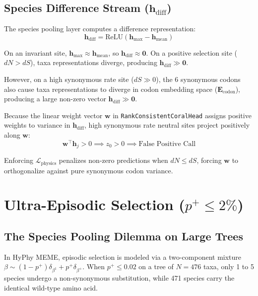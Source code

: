 \documentclass[11pt,a4paper]{article}
\begin{document}
\subsection{Species Difference Stream ($\mathbf{h}_{\text{diff}}$)}
The species pooling layer computes a difference representation:
\begin{equation}
\mathbf{h}_{\text{diff}} = \text{ReLU}\left(\mathbf{h}_{\text{max}} - \mathbf{h}_{\text{mean}}\right)
\end{equation}

On an invariant site, $\mathbf{h}_{\text{max}} \approx \mathbf{h}_{\text{mean}}$, so $\mathbf{h}_{\text{diff}} \approx \mathbf{0}$. On a positive selection site ($dN > dS$), taxa representations diverge, producing $\mathbf{h}_{\text{diff}} \gg \mathbf{0}$.

However, on a high synonymous rate site ($dS \gg 0$), the 6 synonymous codons also cause taxa representations to diverge in codon embedding space ($\mathbf{E}_{\text{codon}}$), producing a large non-zero vector $\mathbf{h}_{\text{diff}} \gg \mathbf{0}$.

Because the linear weight vector $\mathbf{w}$ in \texttt{RankConsistentCoralHead} assigns positive weights to variance in $\mathbf{h}_{\text{diff}}$, high synonymous rate neutral sites project positively along $\mathbf{w}$:
\begin{equation}
\mathbf{w}^\top \mathbf{h}_j > 0 \implies z_0 > 0 \implies \text{False Positive Call}
\end{equation}

Enforcing $\mathcal{L}_{\text{physics}}$ penalizes non-zero predictions when $dN \le dS$, forcing $\mathbf{w}$ to orthogonalize against pure synonymous codon variance.

\section{Ultra-Episodic Selection ($p^+ \le 2\%$)}

\subsection{The Species Pooling Dilemma on Large Trees}
In HyPhy MEME, episodic selection is modeled via a two-component mixture $\beta \sim (1 - p^+) \delta_{\beta^1} + p^+ \delta_{\beta^+}$. When $p^+ \le 0.02$ on a tree of $N = 476$ taxa, only 1 to 5 species undergo a non-synonymous substitution, while 471 species carry the identical wild-type amino acid.
\end{document}
